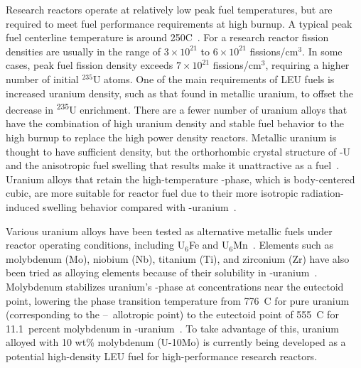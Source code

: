 Research reactors operate at relatively low peak fuel temperatures, but are required to meet fuel performance requirements at high burnup. A typical peak fuel centerline temperature is around 250\textdegree C~\cite{meyer2014irradiation}. For a research reactor fission densities are usually in the range of $3\times10^{21}$ to $6\times10^{21}$ fissions/cm$^3$. In some cases, peak fuel fission density exceeds $7\times10^{21}$ fissions/cm$^3$, requiring a higher number of initial $^{235}$U atoms. One of the main requirements of LEU fuels is increased uranium density, such as that found in metallic uranium, to offset the decrease in \textsuperscript{235}U enrichment. There are a fewer number of uranium alloys that have the combination of high uranium density and stable fuel behavior to the high burnup to replace the high power density reactors.  Metallic uranium is thought to have sufficient density, but the orthorhombic crystal structure of \textalpha-U
and the anisotropic fuel swelling that results make it unattractive as a fuel~\cite{pugh1961swelling}.
Uranium alloys that retain the high-temperature \textgamma-phase, which is body-centered cubic, are more suitable for reactor fuel due to their more isotropic radiation-induced swelling behavior compared with  \textalpha-uranium~\cite{kittel1993history}.

Various uranium alloys have been tested as alternative metallic fuels under reactor operating conditions, including U$_6$Fe and U$_6$Mn~\cite{meyer2000irradiation,hofman1987irradiation}.
Elements such as molybdenum (Mo), niobium (Nb), titanium (Ti), and zirconium (Zr) have also been tried as alloying elements because of their solubility in \textgamma-uranium~\cite{donze1959stabilisation,giraud1973formation,lopes2013mechanical}. Molybdenum stabilizes uranium's \textgamma-phase at concentrations near the eutectoid point, lowering the phase transition temperature from 776~\textdegree C for pure uranium (corresponding to the \textbeta--\textgamma\ allotropic point) to the eutectoid point of 555~\textdegree C for 11.1~percent molybdenum in \textgamma-uranium~\cite{ASM-Alloy-Mo,Berche2011}. To take advantage of this, uranium alloyed with 10 wt$\%$ molybdenum (U-10Mo) is currently being developed as a potential high-density LEU fuel for high-performance research reactors. 

